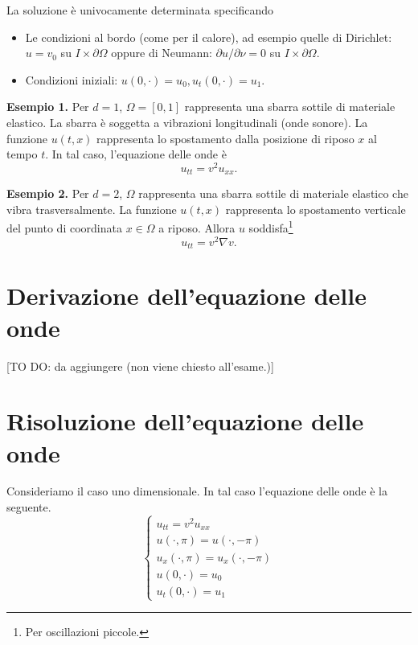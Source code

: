 La soluzione è univocamente determinata specificando

\begin{itemize}

	\item Le condizioni al bordo (come per il calore), ad esempio quelle di Dirichlet: $u = v_0$ su $I \times \partial \Omega$ oppure di Neumann: $\partial u / \partial \nu = 0$ su $I \times \partial \Omega$.


	\item Condizioni iniziali: $u(0,\cdot) = u_0, u_t(0,\cdot) = u_1$.

\end{itemize}

\textbf{Esempio 1.} Per $d = 1$, $\Omega = [0,1]$ rappresenta una sbarra sottile di materiale elastico. La sbarra è soggetta a vibrazioni longitudinali (onde sonore).
La funzione $u(t,x)$ rappresenta lo spostamento dalla posizione di riposo $x$ al tempo $t$.
In tal caso, l'equazione delle onde è
%
$$
	u_{tt} = v^2 u_{xx}.
$$
%


\textbf{Esempio 2.} Per $d=2$, $\Omega$ rappresenta una sbarra sottile di materiale elastico che vibra trasversalmente. La funzione $u(t,x)$ rappresenta lo spostamento verticale del punto di coordinata $x \in \Omega$ a riposo. Allora $u$ soddisfa\footnote{Per oscillazioni piccole.}
%
$$
	u_{tt} = v^2 \nabla v.
$$
%



\section{Derivazione dell'equazione delle onde}

[TO DO: da aggiungere (non viene chiesto all'esame.)]

\section{Risoluzione dell'equazione delle onde}

Consideriamo il caso uno dimensionale. In tal caso l'equazione delle onde è la seguente.
%
\begin{equation}
\tag{P} \label{eq:17nov2021_problem_1}
\begin{cases}
	u_{tt} = v^2 u_{xx} \\
	u(\cdot, \pi) = u(\cdot, -\pi) \\
	u_x(\cdot, \pi) = u_x(\cdot, -\pi) \\
	u(0,\cdot) = u_0 \\
	u_t(0,\cdot) = u_1
\end{cases} 
\end{equation}

